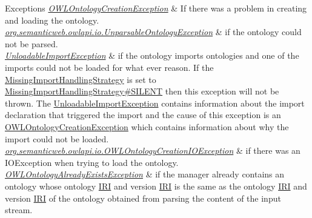 \begin{DoxyExceptions}{Exceptions}
{\em \hyperlink{classorg_1_1semanticweb_1_1owlapi_1_1model_1_1_o_w_l_ontology_creation_exception}{O\-W\-L\-Ontology\-Creation\-Exception}} & If there was a problem in creating and loading the ontology. \\
\hline
{\em \hyperlink{classorg_1_1semanticweb_1_1owlapi_1_1io_1_1_unparsable_ontology_exception}{org.\-semanticweb.\-owlapi.\-io.\-Unparsable\-Ontology\-Exception}} & if the ontology could not be parsed. \\
\hline
{\em \hyperlink{classorg_1_1semanticweb_1_1owlapi_1_1model_1_1_unloadable_import_exception}{Unloadable\-Import\-Exception}} & if the ontology imports ontologies and one of the imports could not be loaded for what ever reason. If the \hyperlink{enumorg_1_1semanticweb_1_1owlapi_1_1model_1_1_missing_import_handling_strategy}{Missing\-Import\-Handling\-Strategy} is set to \hyperlink{enumorg_1_1semanticweb_1_1owlapi_1_1model_1_1_missing_import_handling_strategy_aed66060ec95dc4ad59ca4dd82509782b}{Missing\-Import\-Handling\-Strategy\#\-S\-I\-L\-E\-N\-T} then this exception will not be thrown. The {\ttfamily \hyperlink{classorg_1_1semanticweb_1_1owlapi_1_1model_1_1_unloadable_import_exception}{Unloadable\-Import\-Exception}} contains information about the import declaration that triggered the import and the cause of this exception is an {\ttfamily \hyperlink{classorg_1_1semanticweb_1_1owlapi_1_1model_1_1_o_w_l_ontology_creation_exception}{O\-W\-L\-Ontology\-Creation\-Exception}} which contains information about why the import could not be loaded. \\
\hline
{\em \hyperlink{classorg_1_1semanticweb_1_1owlapi_1_1io_1_1_o_w_l_ontology_creation_i_o_exception}{org.\-semanticweb.\-owlapi.\-io.\-O\-W\-L\-Ontology\-Creation\-I\-O\-Exception}} & if there was an {\ttfamily I\-O\-Exception} when trying to load the ontology. \\
\hline
{\em \hyperlink{classorg_1_1semanticweb_1_1owlapi_1_1model_1_1_o_w_l_ontology_already_exists_exception}{O\-W\-L\-Ontology\-Already\-Exists\-Exception}} & if the manager already contains an ontology whose ontology \hyperlink{classorg_1_1semanticweb_1_1owlapi_1_1model_1_1_i_r_i}{I\-R\-I} and version \hyperlink{classorg_1_1semanticweb_1_1owlapi_1_1model_1_1_i_r_i}{I\-R\-I} is the same as the ontology \hyperlink{classorg_1_1semanticweb_1_1owlapi_1_1model_1_1_i_r_i}{I\-R\-I} and version \hyperlink{classorg_1_1semanticweb_1_1owlapi_1_1model_1_1_i_r_i}{I\-R\-I} of the ontology obtained from parsing the content of the input stream. \\
\hline
\end{DoxyExceptions}


